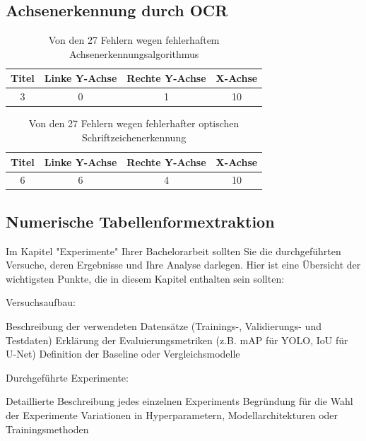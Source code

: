 \subsection{Achsenerkennung durch OCR}
\begin{table}[H]
    \centering
    \begin{tabular}{|c|c|c|c|}
        \hline
        \rowcolor[HTML]{EFEFEF}
        Titel & Linke Y-Achse & Rechte Y-Achse & X-Achse \\ \hline
        3     & 0             & 1              & 10      \\ \hline
    \end{tabular}
    \caption{Von den 27 Fehlern wegen fehlerhaftem Achsenerkennungsalgorithmus}
\end{table}

\begin{table}[H]
    \centering
    \begin{tabular}{|c|c|c|c|}
        \hline
        \rowcolor[HTML]{EFEFEF}
        Titel & Linke Y-Achse & Rechte Y-Achse & X-Achse \\ \hline
        6     & 6             & 4              & 10      \\ \hline
    \end{tabular}
    \caption{Von den 27 Fehlern wegen fehlerhafter optischen Schriftzeichenerkennung}
\end{table}




\subsection{Numerische Tabellenformextraktion}



Im Kapitel "Experimente" Ihrer Bachelorarbeit sollten Sie die durchgeführten Versuche, deren Ergebnisse und Ihre Analyse darlegen. Hier ist eine Übersicht der wichtigsten Punkte, die in diesem Kapitel enthalten sein sollten:

Versuchsaufbau:

Beschreibung der verwendeten Datensätze (Trainings-, Validierungs- und Testdaten)
Erklärung der Evaluierungsmetriken (z.B. mAP für YOLO, IoU für U-Net)
Definition der Baseline oder Vergleichsmodelle


Durchgeführte Experimente:

Detaillierte Beschreibung jedes einzelnen Experiments
Begründung für die Wahl der Experimente
Variationen in Hyperparametern, Modellarchitekturen oder Trainingsmethoden


